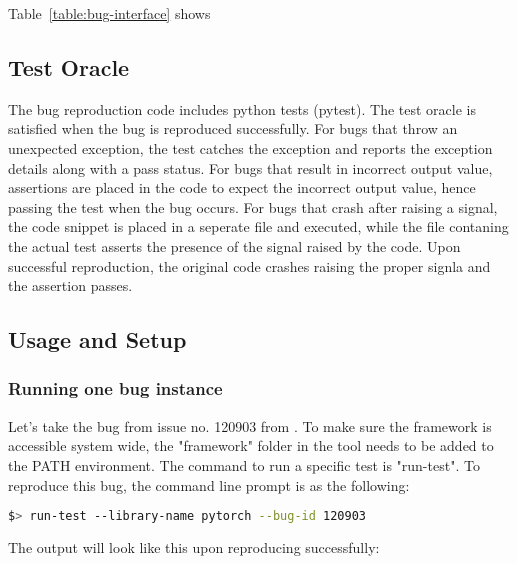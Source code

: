 \documentclass[sigconf,screen]{acmart}
\begin{document}
Table~\ref{table:bug-interface} shows 

\subsection{Test Oracle}


The bug reproduction code includes python tests (pytest). The test oracle is satisfied when the bug is reproduced successfully. For bugs that throw an unexpected exception, the test catches the exception and reports the exception details along with a pass status. For bugs that result in incorrect output value, assertions are placed in the code to expect the incorrect output value, hence passing the test when the bug occurs. For bugs that crash after raising a signal, the code snippet is placed in a seperate file and executed, while the file contaning the actual test asserts the presence of the signal raised by the code. Upon successful reproduction, the original code crashes raising the proper signla and the assertion passes.


\subsection{Usage and Setup}

\subsubsection{Running one bug instance}


Let's take the bug from issue no. 120903 from \torch. To make sure the framework is accessible system wide, the "framework" folder in the tool needs to be added to the PATH environment. The command to run a specific test is "run-test". To reproduce this bug, the command line prompt is as the following:

\begin{lstlisting}[language=bash]
  $> run-test --library-name pytorch --bug-id 120903
\end{lstlisting}

The output will look like this upon reproducing successfully:
\end{document}
